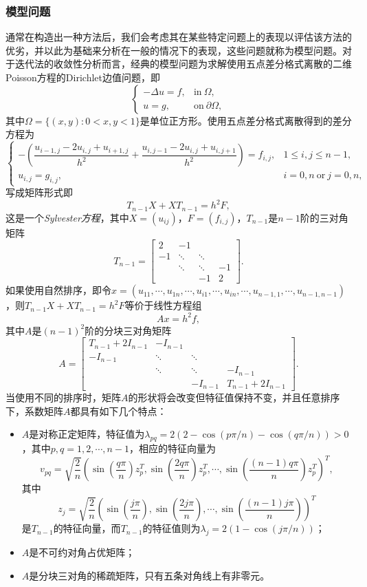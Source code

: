 \documentclass[a4paper,10pt]{ctexart}
\begin{document}
\subsubsection{模型问题}
通常在构造出一种方法后，我们会考虑其在某些特定问题上的表现以评估该方法的优劣，并以此为基础来分析在一般的情况下的表现，这些问题就称为模型问题。对于迭代法的收敛性分析而言，经典的模型问题为求解使用五点差分格式离散的二维Poisson方程的Dirichlet边值问题，即
\[
    \begin{cases}
        -\Delta u = f, & \text{in} \ \Omega,\\
        u = g, & \text{on} \ \partial \Omega,
    \end{cases}
\]
其中$ \Omega=\{(x,y):0<x,y<1\} $是单位正方形。使用五点差分格式离散得到的差分方程为
\[
    \begin{cases}
        -\left( \dfrac{u_{i-1,j} - 2u_{i,j} + u_{i+1,j}}{h^2} + \dfrac{u_{i,j-1} - 2u_{i,j} + u_{i,j+1}}{h^2} \right)  = f_{i,j}, & 1\leqslant i,j\leqslant n-1,\\
        u_{i,j} = g_{i,j}, & i=0,n \ \text{or} \ j=0,n,
    \end{cases}
\]
写成矩阵形式即
\[
    T_{n-1}X + XT_{n-1} = h^2 F,
\]
这是一个\emph{Sylvester方程}，其中$ X=(u_{ij}) $，$ F=(f_{i,j}) $，$ T_{n-1} $是$ n-1 $阶的三对角矩阵
\[
    T_{n-1} = 
    \begin{bmatrix} 
        2 & -1 & & \\
        -1 & \ddots & \ddots & \\
        & \ddots & \ddots & -1 \\
        & & -1 & 2
    \end{bmatrix}.
\]
如果使用自然排序，即令$ x=(u_{11},\cdots ,u_{1n},\cdots ,u_{i1},\cdots,u_{in},\cdots ,u_{n-1,1},\cdots ,u_{n-1,n-1}) $，则$ T_{n-1}X + XT_{n-1} = h^2 F $等价于线性方程组
\[
    Ax = h^2 f,
\]
其中$ A $是$ (n-1)^2 $阶的分块三对角矩阵
\[
    A = 
    \begin{bmatrix} 
        T_{n-1} + 2I_{n-1} & - I_{n-1} & & \\
        -I_{n-1} & \ddots & \ddots & \\
        & \ddots & \ddots & -I_{n-1} \\
        & & -I_{n-1} & T_{n-1} + 2I_{n-1}
    \end{bmatrix}.
\]
当使用不同的排序时，矩阵$ A $的形状将会改变但特征值保持不变，并且任意排序下，系数矩阵$ A $都具有如下几个特点：
\begin{itemize}
    \item $ A $是对称正定矩阵，特征值为$ \lambda_{pq} = 2(2-\cos(p \pi / n) - \cos(q \pi / n))>0 $，其中$ p,q = 1,2,\cdots ,n-1 $，相应的特征向量为
    \[
        v_{pq} = \sqrt{\frac{2}{n}} \left( \sin(\frac{q\pi}{n})z_p^T,\sin(\frac{2q\pi}{n})z_p^T, \cdots ,\sin(\frac{(n-1)q\pi}{n})z_p^T \right)^T,
    \]
    其中
    \[
        z_j = \sqrt{\frac{2}{n}} \left( \sin(\frac{j\pi}{n}),\sin(\frac{2j\pi}{n}), \cdots ,\sin(\frac{(n-1)j\pi}{n}) \right)^T
    \]
    是$ T_{n-1} $的特征向量，而$ T_{n-1} $的特征值则为$ \lambda_j = 2(1-\cos(j \pi / n)) $；
    \item $ A $是不可约对角占优矩阵；
    \item $ A $是分块三对角的稀疏矩阵，只有五条对角线上有非零元。
\end{itemize}
\end{document}
